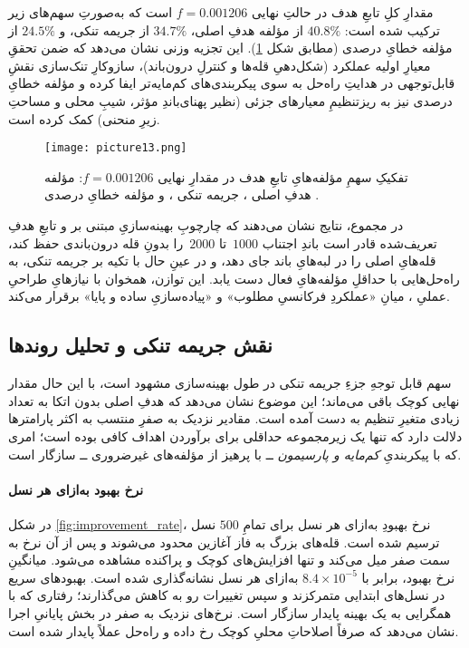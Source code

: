 مقدارِ کلِ تابعِ هدف در حالتِ نهایی \(f=0.001206\) است که به‌صورتِ سهم‌های زیر ترکیب شده است: \(40.8\%\) از مؤلفه هدفِ اصلی، \(34.7\%\) از جریمه تنکی، و \(24.5\%\) از مؤلفه خطایِ درصدی (مطابق شکل \ref{fig:objective_breakdown}). این تجزیه وزنی نشان می‌دهد که ضمن تحققِ معیارِ اولیه عملکرد (شکل‌دهیِ قله‌ها و کنترلِ درون‌باند)، سازوکارِ تنک‌سازی نقشِ قابل‌توجهی در هدایتِ راه‌حل به سوی پیکربندی‌های کم‌مایه‌تر ایفا کرده و مؤلفه خطایِ درصدی نیز به ریزتنظیمِ معیارهای جزئی (نظیر پهنای‌باندِ مؤثر، شیبِ محلی و مساحتِ زیرِ منحنی) کمک کرده است.

\begin{figure}[htbp]
  \centering
  \texttt{[image: picture13.png]}%
  \caption{تفکیکِ سهمِ مؤلفه‌هایِ تابعِ هدف در مقدارِ نهایی \(f=0.001206\): مؤلفه هدفِ اصلی ، جریمه تنکی ، و مؤلفه خطایِ درصدی .}
  \label{fig:objective_breakdown}
\end{figure}

در مجموع، نتایج نشان می‌دهند که چارچوبِ بهینه‌سازیِ مبتنی بر  و تابعِ هدفِ تعریف‌شده قادر است باندِ اجتناب \(1000\)\, تا \(2000\)\, را بدونِ قله درون‌باندی حفظ کند، قله‌هایِ اصلی را در لبه‌هایِ باند جای دهد، و در عینِ حال با تکیه بر جریمه تنکی، به راه‌حل‌هایی با حداقلِ مؤلفه‌هایِ فعال دست یابد. این توازن، همخوان با نیازهایِ طراحیِ عملیِ ، میانِ «عملکردِ فرکانسیِ مطلوب» و «پیاده‌سازیِ ساده و پایا» برقرار می‌کند.



\subsection{نقش جریمه تنکی و تحلیل روندها}

سهم قابل توجهِ جزءِ جریمه تنکی در طول بهینه‌سازی مشهود است، با این حال مقدار نهایی کوچک باقی می‌ماند؛ این موضوع نشان می‌دهد که هدفِ اصلی بدون اتکا به تعداد زیادی متغیرِ تنظیم به دست آمده است. مقادیر نزدیک به صفرِ منتسب به اکثر پارامترها دلالت دارد که تنها یک زیرمجموعه حداقلی برای برآوردن اهداف کافی بوده است؛ امری که با پیکربندیِ \emph{کم‌مایه و پارسیمون}  ــ با پرهیز از مؤلفه‌های غیرضروری ــ سازگار است.

\paragraph{نرخ بهبود به‌ازای هر نسل}
در شکل \ref{fig:improvement_rate}، نرخ بهبودِ به‌ازای هر نسل برای تمامِ \(500\) نسل ترسیم شده است. قله‌های بزرگ به فاز آغازین محدود می‌شوند و پس از آن نرخ به سمت صفر میل می‌کند و تنها افزایش‌های کوچک و پراکنده مشاهده می‌شود. میانگینِ نرخ بهبود، برابر با \(8.4\times 10^{-5}\) به‌ازای هر نسل نشانه‌گذاری شده است. بهبودهای سریع در نسل‌های ابتدایی متمرکزند و سپس تغییرات رو به کاهش می‌گذارند؛ رفتاری که با همگرایی به یک بهینه پایدار سازگار است. نرخ‌های نزدیک به صفر در بخش پایانیِ اجرا نشان می‌دهد که صرفاً اصلاحاتِ محلیِ کوچک رخ داده و راه‌حل عملاً پایدار شده است.

